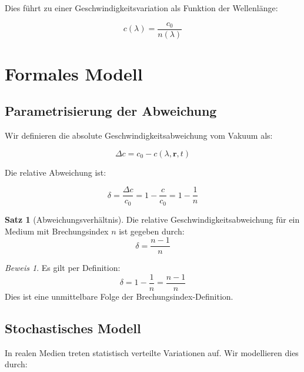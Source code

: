 \documentclass[12pt,a4paper,oneside]{article}
\theoremstyle{definition}
\newtheorem{satz}{Satz}[section]
\theoremstyle{remark}
\newtheorem*{beweis}{Beweis}
\newcommand{\cLight}{c}
\newcommand{\refIndex}{n}
\newcommand{\deviation}{\Delta}
\begin{document}
Dies führt zu einer Geschwindigkeitsvariation als Funktion der Wellenlänge:

\begin{equation}
    \cLight(\lambda) = \frac{\cLight_0}{\refIndex(\lambda)}
\end{equation}

\section{Formales Modell}

\subsection{Parametrisierung der Abweichung}

Wir definieren die absolute Geschwindigkeitsabweichung vom Vakuum als:

\begin{equation}
    \deviation \cLight = \cLight_0 - \cLight(\lambda, \mathbf{r}, t)
\end{equation}

Die relative Abweichung ist:

\begin{equation}
    \delta = \frac{\deviation \cLight}{\cLight_0} = 1 - \frac{\cLight}{\cLight_0} = 1 - \frac{1}{\refIndex}
\end{equation}

\begin{satz}[Abweichungsverhältnis]
Die relative Geschwindigkeitsabweichung für ein Medium mit Brechungsindex $\refIndex$ ist gegeben durch:
\begin{equation}
    \delta = \frac{\refIndex - 1}{\refIndex}
\end{equation}
\end{satz}

\begin{beweis}
Es gilt per Definition:
\begin{equation}
    \delta = 1 - \frac{1}{\refIndex} = \frac{\refIndex - 1}{\refIndex}
\end{equation}
Dies ist eine unmittelbare Folge der Brechungsindex-Definition.
\end{beweis}

\subsection{Stochastisches Modell}

In realen Medien treten statistisch verteilte Variationen auf. Wir modellieren dies durch:
\end{document}

